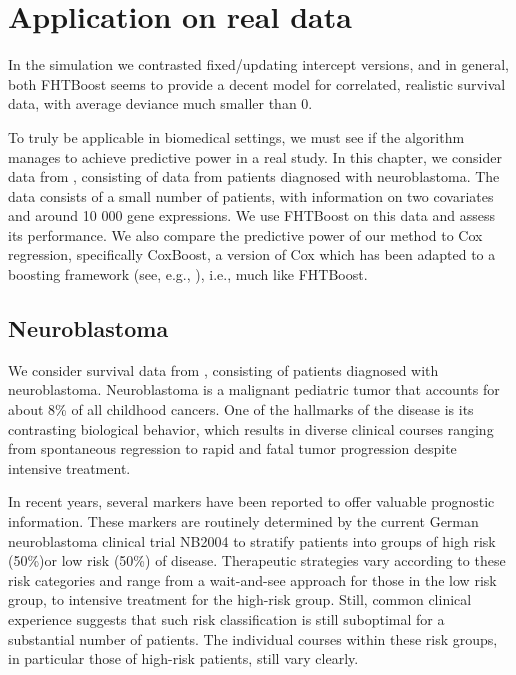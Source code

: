\chapter{Application on real data}
In the simulation we contrasted fixed/updating intercept versions, and in general, both FHTBoost seems to provide a decent model for correlated, realistic survival data, with average deviance much smaller than 0.


To truly be applicable in biomedical settings, we must see if the algorithm manages to achieve predictive power in a real study.
In this chapter, we consider data from \citet{oberthuer-data}, consisting of data from patients diagnosed with neuroblastoma.
The data consists of a small number of patients, with information on two covariates and around 10 000 gene expressions.
We use FHTBoost on this data and assess its performance.
We also compare the predictive power of our method to Cox regression, specifically CoxBoost, a version of Cox which has been adapted to a boosting framework (see, e.g., \citet{BinderSchumacher2008}), i.e., much like FHTBoost.

\section{Neuroblastoma}
We consider survival data from \citet{oberthuer-data}, consisting of patients diagnosed with neuroblastoma.
Neuroblastoma is a malignant pediatric tumor that accounts for about 8\% of all childhood cancers.
One of the hallmarks of the disease is its contrasting biological behavior, which results in diverse clinical courses ranging from spontaneous regression to rapid and fatal tumor progression despite intensive treatment.

In recent years, several markers have been reported to offer valuable prognostic information.
These markers are routinely determined by the current German neuroblastoma clinical trial NB2004 to stratify patients into groups of high risk (50\%)or low risk (50\%) of disease.
Therapeutic strategies vary according to these risk categories and range from a wait-and-see approach for those in the low risk group,
to intensive treatment for the high-risk group. Still, common clinical experience suggests that such risk classification is still suboptimal for a substantial number of patients.
The individual courses within these risk groups, in particular those of high-risk patients, still vary clearly.


